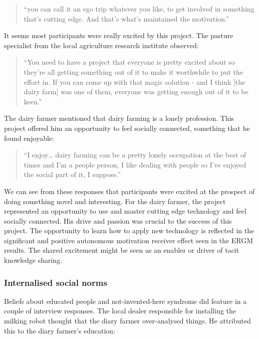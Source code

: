 \begin{quote}
\small
\enquote{you can call it an ego trip whatever you like, to get involved in something that's cutting edge. And that's what's maintained the motivation.} \\
\end{quote}

It seems most participants were really excited by this project. The pasture specialist from the local agriculture research institute observed:

\begin{quote}
\small
\enquote{You need to have a project that everyone is pretty excited about so they're all getting something out of it to make it worthwhile to put the effort in. If you can come up with that magic solution - and I think [the dairy farm] was one of them, everyone was getting enough out of it to be keen.} \\
\end{quote}

The dairy farmer mentioned that dairy farming is a lonely profession. This project offered him an opportunity to feel socially connected, something that he found enjoyable:

\begin{quote}
\small
\enquote{I enjoy… dairy farming can be a pretty lonely occupation at the best of times and I'm a people person, I like dealing with people so I've enjoyed the social part of it, I suppose.} \\
\end{quote}

We can see from these responses that participants were excited at the prospect of doing something novel and interesting. For the dairy farmer, the project represented an opportunity to use and master cutting edge technology and feel socially connected. His drive and passion was crucial to the success of this project. The opportunity to learn how to apply new technology is reflected in the significant and positive autonomous motivation receiver effect seen in the ERGM results. The shared excitement might be seen as an enabler or driver of tacit knowledge sharing.

\subsubsection{Internalised social norms}

Beliefs about educated people and not-invented-here syndrome did feature in a couple of interview responses. The local dealer responsible for installing the milking robot thought that the diary farmer over-analysed things. He attributed this to the diary farmer's education:

